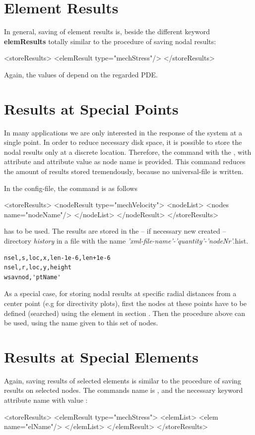 \section{Element Results}
In general, saving of element results is, beside the different keyword
{\bf elemResults} totally similar to the procedure of saving nodal
results:
\begin{xmllisting}
<storeResults>
   <elemResult type="mechStress"/>
</storeResults>
\end{xmllisting}
Again, the values of  depend on the regarded PDE. 


\section{Results at Special Points} 
In many applications we are only interested in the response of the
system at a single point. In order to reduce necessary disk space,
it is possible to store the nodal results only at a discrete
location. Therefore, the command  with the
, with attribute  and attribute value as node name
 is provided. This command
reduces the amount of results stored tremendously, because no
universal-file is written.

In the config-file, the command is as follows

\begin{xmllisting}
<storeResults>
   <nodeResult type="mechVelocity">
    <nodeList>
     <nodes name="nodeName"/>
    </nodeList>
   </nodeResult>
</storeResults>
\end{xmllisting}

has to be used. The results are stored in the -- if necessary new
created -- directory {\em history} in a file with the name {\em
  'xml-file-name'-'quantity'-'nodeNr'}.hist.

\begin{verbatim}
nsel,s,loc,x,len-1e-6,len+1e-6
nsel,r,loc,y,height
wsavnod,'ptName'
\end{verbatim}

As a special case, for storing nodal results at specific radial distances
from a center point (e.g for directivity plots), first the nodes at these
points have to be defined (searched) using the element
 in section . Then the
procedure above can be used, using the name given to this set of
nodes. 

\section{Results at Special Elements} 
Again, saving results of selected elements is similar to the procedure
of saving results on selected nodes. The commands name is ,
and the necessary keyword attribute name  with value
:
\begin{xmllisting}
   <storeResults>
      <elemResult type="mechStress">
       <elemList>
        <elem name="elName"/>
       </elemList>
      </elemResult>
   </storeResults>
\end{xmllisting}

